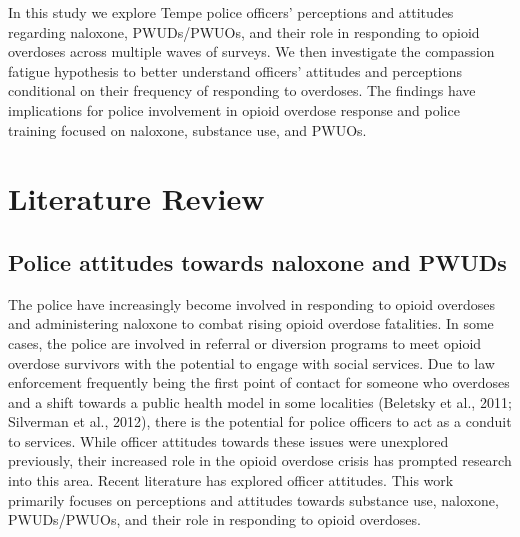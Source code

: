 In this study we explore Tempe police officers’ perceptions and attitudes regarding naloxone, PWUDs/PWUOs, and their role in responding to opioid overdoses across multiple waves of surveys. We then investigate the compassion fatigue hypothesis to better understand officers’ attitudes and perceptions conditional on their frequency of responding to overdoses. The findings have implications for police involvement in opioid overdose response and police training focused on naloxone, substance use, and PWUOs. 

\section{Literature Review}
\subsection{Police attitudes towards naloxone and PWUDs}
The police have increasingly become involved in responding to opioid overdoses and administering naloxone to combat rising opioid overdose fatalities. In some cases, the police are involved in referral or diversion programs to meet opioid overdose survivors with the potential to engage with social services. Due to law enforcement frequently being the first point of contact for someone who overdoses and a shift towards a public health model in some localities (Beletsky et al., 2011; Silverman et al., 2012), there is the potential for police officers to act as a conduit to services. While officer attitudes towards these issues were unexplored previously, their increased role in the opioid overdose crisis has prompted research into this area. Recent literature has explored officer attitudes. This work primarily focuses on perceptions and attitudes towards substance use, naloxone, PWUDs/PWUOs, and their role in responding to opioid overdoses.

